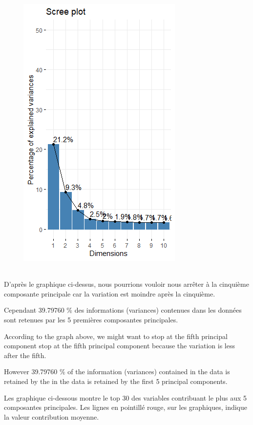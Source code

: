 \documentclass[12pt]{article}
\begin{document}
\begin{figure}[H]
\begin{center}
\includegraphics[scale=1.4]{ACP_1.png} 
\caption[]{\ }
\end{center}
\end{figure}

D'après le graphique ci-dessus, nous pourrions vouloir nous 
arrêter à la cinquième composante principale  car la variation est moindre après la cinquième.

Cependant 39.79760 \% des informations (variances) contenues
dans les données sont retenues par les 5  premières composantes principales.


According to the graph above, we might want to stop at the fifth principal component 
stop at the fifth principal component because the variation is less after the fifth.

However 39.79760 \% of the information (variances) contained in the data is retained by the
in the data is retained by the first 5 principal components.


Les graphique ci-dessous montre le top 30 des variables contribuant le plus aux 5 composantes principales. 
Les lignes en pointillé rouge, sur les graphiques, indique  la valeur  contribution moyenne.
 
\end{document}
